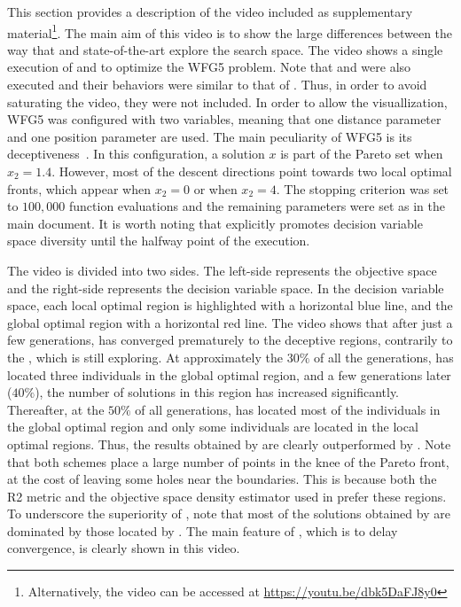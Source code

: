 This section provides a description of the video included as supplementary material\footnote{Alternatively, the video can be accessed 
at \url{https://youtu.be/dbk5DaFJ8y0}}.
%
The main aim of this video is to show the large differences between the way that \VSDMOEA{} and state-of-the-art \MOEAS{} 
explore the search space.
%
The video shows a single execution of \VSDMOEA{} and \RMOEA{} to optimize the WFG5 problem.
%
Note that \NSGAII{} and \MOEAD{} were also executed and their behaviors were similar to that of \RMOEA{}.
%
Thus, in order to avoid saturating the video, they were not included.
%
In order to allow the visuallization, WFG5 was configured with two variables, meaning that one distance parameter
and one position parameter are used.
%
The main peculiarity of WFG5 is its deceptiveness~\cite{Joel:WFG}.
%
In this configuration, a solution $x$ is part of the Pareto set when $x_2 = 1.4$.
%
However, most of the descent directions point towards two local optimal fronts, which appear when $x_2 = 0$ or when $x_2 = 4$.
%
The stopping criterion was set to $100,000$ function evaluations and the remaining parameters were set as in the main document.
%
It is worth noting that \VSDMOEA{} explicitly promotes decision variable space diversity until the halfway point of the execution.

The video is divided into two sides.
%
The left-side represents the objective space and the right-side represents the decision variable space.
%
In the decision variable space, each local optimal region is highlighted with a horizontal blue line, and the global optimal region with a horizontal red line.
%
The video shows that after just a few generations, \RMOEA{} has converged prematurely to the deceptive regions, 
contrarily to the \VSDMOEA{}, which is still exploring.
%
At approximately the $30\%$ of all the generations, \VSDMOEA{} has located three individuals in the global optimal region, and a few generations later ($40\%$),
the number of solutions in this region has increased significantly.
%
Thereafter, at the $50\%$ of all generations, \VSDMOEA{} has located most of the individuals in the global optimal region and only 
some individuals are located in the local optimal regions.
%
Thus, the results obtained by \RMOEA{} are clearly outperformed by \VSDMOEA{}.
%
Note that both schemes place a large number of points in the knee of the Pareto front, at the cost of leaving some holes near the boundaries.
%
This is because both the R2 metric and the objective space density estimator used in \VSDMOEA{} prefer these regions.
%
To underscore the superiority of \VSDMOEA{}, note that most of the solutions obtained by \RMOEA{} are dominated by those 
located by \VSDMOEA{}.
%
The main feature of \VSDMOEA{}, which is to delay convergence, is clearly shown in this video.
